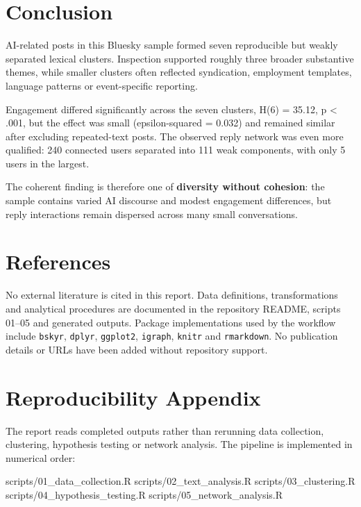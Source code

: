 \documentclass[
]{article}
\newenvironment{Shaded}{\begin{snugshade}}{\end{snugshade}}
\newcommand{\NormalTok}[1]{#1}
\begin{document}
\section{Conclusion}\label{conclusion}

AI-related posts in this Bluesky sample formed seven reproducible but
weakly separated lexical clusters. Inspection supported roughly three
broader substantive themes, while smaller clusters often reflected
syndication, employment templates, language patterns or event-specific
reporting.

Engagement differed significantly across the seven clusters, H(6) =
35.12, p \textless{} .001, but the effect was small (epsilon-squared =
0.032) and remained similar after excluding repeated-text posts. The
observed reply network was even more qualified: 240 connected users
separated into 111 weak components, with only 5 users in the largest.

The coherent finding is therefore one of \textbf{diversity without
cohesion}: the sample contains varied AI discourse and modest engagement
differences, but reply interactions remain dispersed across many small
conversations.

\section{References}\label{references}

No external literature is cited in this report. Data definitions,
transformations and analytical procedures are documented in the
repository README, scripts 01--05 and generated outputs. Package
implementations used by the workflow include \texttt{bskyr},
\texttt{dplyr}, \texttt{ggplot2}, \texttt{igraph}, \texttt{knitr} and
\texttt{rmarkdown}. No publication details or URLs have been added
without repository support.

\section{Reproducibility Appendix}\label{reproducibility-appendix}

The report reads completed outputs rather than rerunning data
collection, clustering, hypothesis testing or network analysis. The
pipeline is implemented in numerical order:

\begin{Shaded}
\begin{Highlighting}[]
\NormalTok{scripts/01\_data\_collection.R}
\NormalTok{scripts/02\_text\_analysis.R}
\NormalTok{scripts/03\_clustering.R}
\NormalTok{scripts/04\_hypothesis\_testing.R}
\NormalTok{scripts/05\_network\_analysis.R}
\end{Highlighting}
\end{Shaded}
\end{document}
